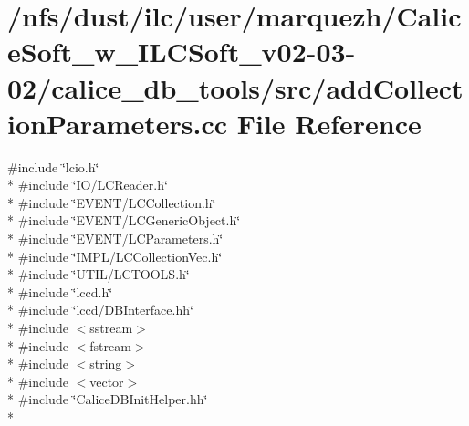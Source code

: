 \section{/nfs/dust/ilc/user/marquezh/\-Calice\-Soft\-\_\-w\-\_\-\-I\-L\-C\-Soft\-\_\-v02-\/03-\/02/calice\-\_\-db\-\_\-tools/src/add\-Collection\-Parameters.cc File Reference}
\label{addCollectionParameters_8cc}
{\ttfamily \#include \char`\"{}lcio.\-h\char`\"{}}\\*
{\ttfamily \#include \char`\"{}I\-O/\-L\-C\-Reader.\-h\char`\"{}}\\*
{\ttfamily \#include \char`\"{}E\-V\-E\-N\-T/\-L\-C\-Collection.\-h\char`\"{}}\\*
{\ttfamily \#include \char`\"{}E\-V\-E\-N\-T/\-L\-C\-Generic\-Object.\-h\char`\"{}}\\*
{\ttfamily \#include \char`\"{}E\-V\-E\-N\-T/\-L\-C\-Parameters.\-h\char`\"{}}\\*
{\ttfamily \#include \char`\"{}I\-M\-P\-L/\-L\-C\-Collection\-Vec.\-h\char`\"{}}\\*
{\ttfamily \#include \char`\"{}U\-T\-I\-L/\-L\-C\-T\-O\-O\-L\-S.\-h\char`\"{}}\\*
{\ttfamily \#include \char`\"{}lccd.\-h\char`\"{}}\\*
{\ttfamily \#include \char`\"{}lccd/\-D\-B\-Interface.\-hh\char`\"{}}\\*
{\ttfamily \#include $<$sstream$>$}\\*
{\ttfamily \#include $<$fstream$>$}\\*
{\ttfamily \#include $<$string$>$}\\*
{\ttfamily \#include $<$vector$>$}\\*
{\ttfamily \#include \char`\"{}Calice\-D\-B\-Init\-Helper.\-hh\char`\"{}}\\*

